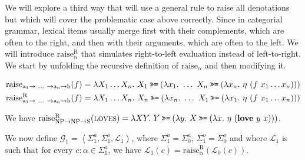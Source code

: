 We will explore a third way that will use a general rule to raise all
denotations but which will cover the problematic case above
correctly. Since in categorial grammar, lexical items usually merge first
with their complements, which are often to the right, and then with their
arguments, which are often to the left. We will introduce
$\mathrm{raise^R_\alpha}$ that simulates right-to-left evaluation
instead of left-to-right. We start by unfolding the recursive definition of
$\mathrm{raise_\alpha}$ and then modifying it.

\begin{align*}
  \mathrm{raise_{a_1 \to\ \ldots\ \to a_n \to b}}(f) &= \lambda X_1 \ldots X_n.\ X_1 \mathbin{\texttt{>>=}} (\lambda x_1.\ \ldots\ X_n \mathbin{\texttt{>>=}} (\lambda x_n.\ \eta\ (f\ x_1 \ldots x_n))) \\
  \mathrm{raise^R_{a_1 \to\ \ldots\ \to a_n \to b}}(f) &= \lambda X_1 \ldots X_n.\ X_n \mathbin{\texttt{>>=}} (\lambda x_n.\ \ldots\ X_1 \mathbin{\texttt{>>=}} (\lambda x_1.\ \eta\ (f\ x_1 \ldots x_n))) \\
\end{align*}

We have $\mathrm{raise^R_{NP \to NP \to S}}(\textsc{loves}) = \lambda X
Y.\ Y \mathbin{\texttt{>>=}} (\lambda y.\ X \mathbin{\texttt{>>=}} (\lambda
x.\ \eta\ (\textbf{love}\ y\ x)))$.

We now define $\mathcal{G}_1 = \left< \Sigma^a_1, \Sigma^o_1, \mathcal{L}_1
\right>$, where $\Sigma^a_1 = \Sigma^a_0$, $\Sigma^o_1 = \Sigma^o_0$ and
where $\mathcal{L}_1$ is such that for every $c : \alpha \in \Sigma^a_1$,
we have $\mathcal{L}_1(c) =
\mathrm{raise^R_\alpha}(\mathcal{L}_0(c))$.
